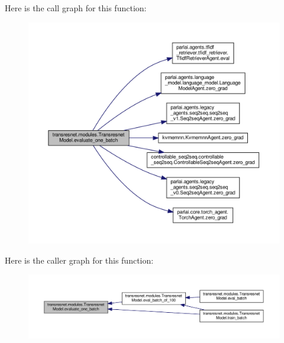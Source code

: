 Here is the call graph for this function\+:
\nopagebreak
\begin{figure}[H]
\begin{center}
\leavevmode
\includegraphics[width=350pt]{classtransresnet_1_1modules_1_1TransresnetModel_a2cce905d8e06109ae23cf4910386526d_cgraph}
\end{center}
\end{figure}
Here is the caller graph for this function\+:
\nopagebreak
\begin{figure}[H]
\begin{center}
\leavevmode
\includegraphics[width=350pt]{classtransresnet_1_1modules_1_1TransresnetModel_a2cce905d8e06109ae23cf4910386526d_icgraph}
\end{center}
\end{figure}
\mbox{\label{classtransresnet_1_1modules_1_1TransresnetModel_a371736aee24f40d0841a74aeb01f9145}} 
